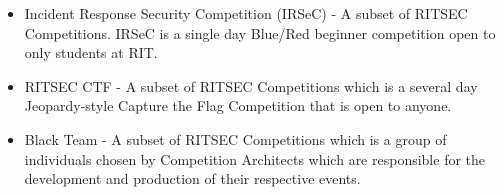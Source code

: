 \begin{itemize}
      \item Incident Response Security Competition (IRSeC) - A subset of RITSEC
            Competitions. IRSeC is a single day Blue/Red beginner competition open to only
            students at RIT.

      \item RITSEC CTF - A subset of RITSEC Competitions which is a several day
            Jeopardy-style Capture the Flag Competition that is open to anyone.

      \item Black Team - A subset of RITSEC Competitions which is a group of individuals
            chosen by Competition Architects which are responsible for the development and
            production of their respective events.

\end{itemize}